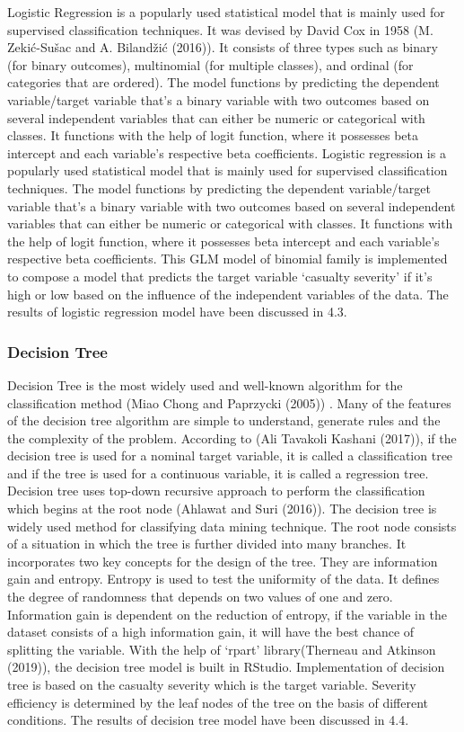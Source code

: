 \documentclass[
  a4paper,
]{article}
\begin{document}
Logistic Regression is a popularly used statistical model that is mainly
used for supervised classification techniques. It was devised by David
Cox in 1958 (M. Zekić-Sušac and A. Bilandžić (2016)). It consists of
three types such as binary (for binary outcomes), multinomial (for
multiple classes), and ordinal (for categories that are ordered). The
model functions by predicting the dependent variable/target variable
that's a binary variable with two outcomes based on several independent
variables that can either be numeric or categorical with classes. It
functions with the help of logit function, where it possesses beta
intercept and each variable's respective beta coefficients. Logistic
regression is a popularly used statistical model that is mainly used for
supervised classification techniques. The model functions by predicting
the dependent variable/target variable that's a binary variable with two
outcomes based on several independent variables that can either be
numeric or categorical with classes. It functions with the help of logit
function, where it possesses beta intercept and each variable's
respective beta coefficients. This GLM model of binomial family is
implemented to compose a model that predicts the target variable
`casualty severity' if it's high or low based on the influence of the
independent variables of the data. The results of logistic regression
model have been discussed in 4.3.

\hypertarget{decision-tree}{%
\subsubsection{Decision Tree}\label{decision-tree}}

Decision Tree is the most widely used and well-known algorithm for the
classification method (Miao Chong and Paprzycki (2005)) . Many of the
features of the decision tree algorithm are simple to understand,
generate rules and the the complexity of the problem. According to (Ali
Tavakoli Kashani (2017)), if the decision tree is used for a nominal
target variable, it is called a classification tree and if the tree is
used for a continuous variable, it is called a regression tree. Decision
tree uses top-down recursive approach to perform the classification
which begins at the root node (Ahlawat and Suri (2016)). The decision
tree is widely used method for classifying data mining technique. The
root node consists of a situation in which the tree is further divided
into many branches. It incorporates two key concepts for the design of
the tree. They are information gain and entropy. Entropy is used to test
the uniformity of the data. It defines the degree of randomness that
depends on two values of one and zero. Information gain is dependent on
the reduction of entropy, if the variable in the dataset consists of a
high information gain, it will have the best chance of splitting the
variable. With the help of `rpart' library(Therneau and Atkinson
(2019)), the decision tree model is built in RStudio. Implementation of
decision tree is based on the casualty severity which is the target
variable. Severity efficiency is determined by the leaf nodes of the
tree on the basis of different conditions. The results of decision tree
model have been discussed in 4.4.
\end{document}
